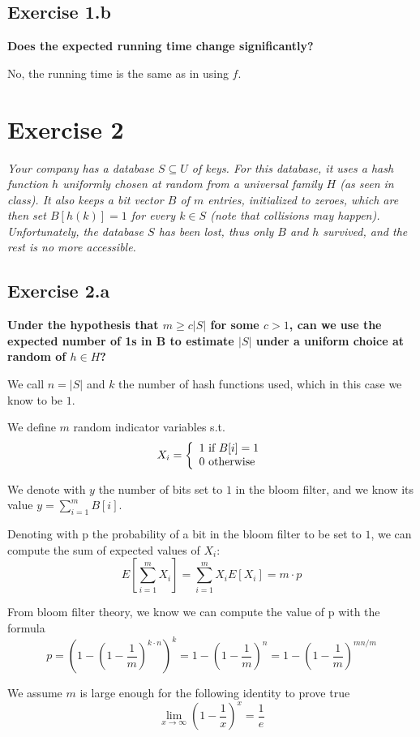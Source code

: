\documentclass{article}
\begin{document}
\subsection*{Exercise 1.b}
\textbf{Does the expected running time change significantly?}

No, the running time is the same as in using \(f\).

\section{Exercise 2}
{
	\itshape
	Your company has a database \(S \subseteq U\) of keys. For this database, 
	it uses a hash function \(h\) uniformly chosen at random from a universal family \(\mathit{H}\)
	(as seen in class). It also keeps a bit vector \(B\) of \(m\) entries, initialized to 
	zeroes, which are then set \(B[h(k)] = 1\) for every \(k \in S\) (note that collisions
	may happen). Unfortunately, the database \(S\) has been lost, thus only \(B\) and \(h\)
	survived, and the rest is no more accessible.
}
\subsection*{Exercise 2.a}
\textbf{Under the hypothesis that \(m \ge c |S|\) for some \(c > 1\),
can we use the expected number of 1s in B to estimate \(|S|\) under a uniform choice at random of \(h \in H\)?}

We call \(n = |S|\) and \(k\) the number of hash functions used, which in this case we know to be \(1\).

We define \(m\) random indicator variables s.t.
\[
X_i =
\left\{ 
	\begin{array}{l}
		1 \ \text{if} \ B[i] = 1 \cr
		0 \ \text{otherwise}
	\end{array} 
\right.
\]

We denote with \(y\) the number of bits set to \(1\) in the bloom filter, and we know its value \(y = \sum_{i=1}^{m} B[i]\).

Denoting with p the probability of a bit in the bloom filter to be set to \(1\), we can compute the sum of
expected values of \(X_i\):
\[ E[\sum_{i=1}^{m} X_i] = \sum_{i=1}^{m} X_i E[X_i] = m \cdot p\]

From bloom filter theory, we know we can compute the value of p with the formula
\[
	p =
	{\left(1-{\left(1-\dfrac{1}{m}\right)}^{k \cdot n}\right)}^k =
	1-{\left(1-\dfrac{1}{m}\right)}^{n} = 
	1-{\left(1-\dfrac{1}{m}\right)}^{mn/m} 
\]

We assume \(m\) is large enough for the following identity to prove true
\[\lim_{x \to \infty} \left(1 - \dfrac{1}{x}\right)^x = \dfrac{1}{e}\]
\end{document}
